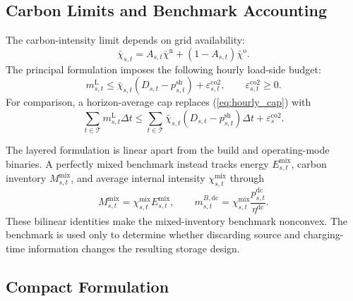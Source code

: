 \documentclass[times]{elsarticle}
\begin{document}
\subsection{Carbon Limits and Benchmark Accounting}

The carbon-intensity limit depends on grid availability:
\begin{equation}
\bar\chi_{s,t}=A_{s,t}\bar\chi^{\mathrm n}
+(1-A_{s,t})\bar\chi^{\mathrm o}.
\label{eq:applicable_cap}
\end{equation}
The principal formulation imposes the following hourly load-side budget:
\begin{equation}
m^{\mathrm L}_{s,t}\le
\bar\chi_{s,t}(D_{s,t}-p^{\mathrm{sh}}_{s,t})
+\varepsilon^{\mathrm{co2}}_{s,t},
\qquad \varepsilon^{\mathrm{co2}}_{s,t}\ge0.
\label{eq:hourly_cap}
\end{equation}
For comparison, a horizon-average cap replaces (\ref{eq:hourly_cap}) with
\begin{equation}
\sum_{t\in\mathcal T}m^{\mathrm L}_{s,t}\Delta t\le
\sum_{t\in\mathcal T}\bar\chi_{s,t}
(D_{s,t}-p^{\mathrm{sh}}_{s,t})\Delta t+\varepsilon^{\mathrm{co2}}_s.
\label{eq:horizon_cap}
\end{equation}

The layered formulation is linear apart from the build and operating-mode
binaries. A perfectly mixed benchmark instead tracks energy
$E^{\mathrm{mix}}_{s,t}$, carbon inventory $M^{\mathrm{mix}}_{s,t}$, and
average internal intensity $\chi^{\mathrm{mix}}_{s,t}$ through
\begin{equation}
M^{\mathrm{mix}}_{s,t}=\chi^{\mathrm{mix}}_{s,t}E^{\mathrm{mix}}_{s,t},
\qquad
m^{B,\mathrm{dc}}_{s,t}=\chi^{\mathrm{mix}}_{s,t}
\frac{p^{\mathrm{dc}}_{s,t}}{\eta^{\mathrm{dc}}}.
\label{eq:average_model}
\end{equation}
These bilinear identities make the mixed-inventory benchmark nonconvex. The
benchmark is used only to determine whether discarding source and charging-time
information changes the resulting storage design.

\subsection{Compact Formulation}
\end{document}
